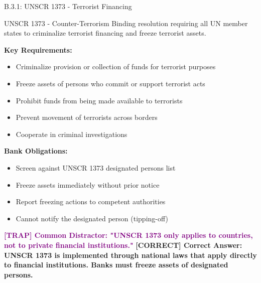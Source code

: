 \documentclass[11pt,a4paper]{beamer}
\newcommand{\trap}[1]{\textcolor{purple}{\textbf{[TRAP] #1}}}
\newcommand{\correct}[1]{\textcolor{green!50!black}{\textbf{[CORRECT] #1}}}
\begin{document}
	\begin{frame}{B.3.1: UNSCR 1373 - Terrorist Financing}
		\begin{block}{UNSCR 1373 - Counter-Terrorism}
			Binding resolution requiring all UN member states to criminalize terrorist financing and freeze terrorist assets.
		\end{block}
		\textbf{Key Requirements:}
		\begin{itemize}
			\item Criminalize provision or collection of funds for terrorist purposes
			\item Freeze assets of persons who commit or support terrorist acts
			\item Prohibit funds from being made available to terrorists
			\item Prevent movement of terrorists across borders
			\item Cooperate in criminal investigations
		\end{itemize}
		\textbf{Bank Obligations:}
		\begin{itemize}
			\item Screen against UNSCR 1373 designated persons list
			\item Freeze assets immediately without prior notice
			\item Report freezing actions to competent authorities
			\item Cannot notify the designated person (tipping-off)
		\end{itemize}
		\trap{Common Distractor: "UNSCR 1373 only applies to countries, not to private financial institutions."}
		\correct{Correct Answer: UNSCR 1373 is implemented through national laws that apply directly to financial institutions. Banks must freeze assets of designated persons.}
	\end{frame}
	
\end{document}
